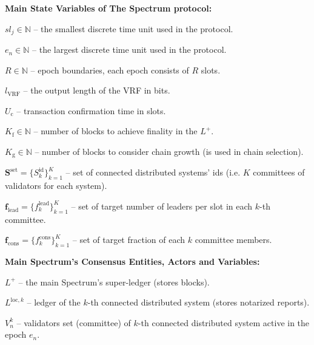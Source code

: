 \noindent
\textbf{Main State Variables of The Spectrum protocol:}
\begin{legal}
    \item[\ding{113}] $sl_j \in \mathbb{N}$ -- the smallest discrete time unit used in the protocol.
    \item[\ding{113}] $e_n \in \mathbb{N}$ -- the largest discrete time unit used in the protocol.
    \item[\ding{113}] $R \in \mathbb{N}$ -- epoch boundaries, each epoch consists of $R$ slots.
    \item[\ding{113}] $l_{\text{VRF}}$ -- the output length of the VRF in bits.
    \item[\ding{113}] $U_{\text{c}}$ -- transaction confirmation time in slots.
    \item[\ding{113}] $K_{\text{f}} \in \mathbb{N}$ -- number of blocks to achieve finality in the $L^+$.
    \item[\ding{113}] $K_{\text{g}} \in \mathbb{N}$ -- number of blocks to consider chain growth (is used in chain selection).
    \item[\ding{113}] $\mathbf{S}^{\text{set}} = \{S_k^{\text{id}}\}_{k=1}^K$ -- set of connected distributed systems' ids (i.e. $K$ committees of validators for each system).
    \item[\ding{113}] $\mathbf{f}_{\text{lead}} = \{f^{\text{lead}}_k\}_{k=1}^K$ -- set of target number of leaders per slot in each $k$-th committee.
    \item[\ding{113}] $\mathbf{f}_{\text{cons}} = \{f^{\text{cons}}_k\}_{k=1}^K$ -- set of target fraction of each $k$ committee members.
\end{legal}
\bigbreak

\noindent
\textbf{Main Spectrum's Consensus Entities, Actors and Variables:}
\begin{legal}
    \item[\ding{113}] $L^+$ -- the main Spectrum's super-ledger (stores blocks).
    \item[\ding{113}] $L^{\text{loc}, k}$ -- ledger of the $k$-th connected distributed system (stores notarized reports).
    \item[\ding{113}] $V^k_n$ -- validators set (committee) of $k$-th connected distributed system active in the epoch $e_n$.
\end{legal}
\bigbreak

